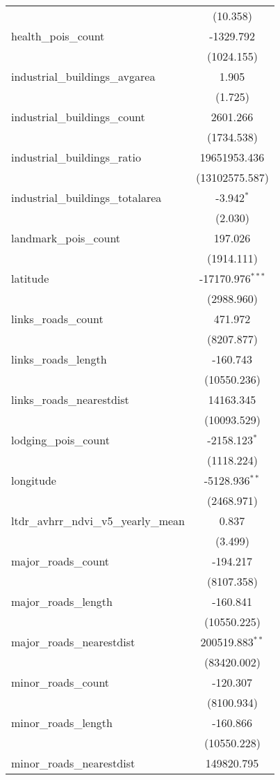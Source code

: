 \begin{table}[!htbp]
\begin{tabular}{@{\extracolsep{5pt}}lc}
  & (10.358) \\
 health_pois_count & -1329.792$^{}$ \\
  & (1024.155) \\
 industrial_buildings_avgarea & 1.905$^{}$ \\
  & (1.725) \\
 industrial_buildings_count & 2601.266$^{}$ \\
  & (1734.538) \\
 industrial_buildings_ratio & 19651953.436$^{}$ \\
  & (13102575.587) \\
 industrial_buildings_totalarea & -3.942$^{*}$ \\
  & (2.030) \\
 landmark_pois_count & 197.026$^{}$ \\
  & (1914.111) \\
 latitude & -17170.976$^{***}$ \\
  & (2988.960) \\
 links_roads_count & 471.972$^{}$ \\
  & (8207.877) \\
 links_roads_length & -160.743$^{}$ \\
  & (10550.236) \\
 links_roads_nearestdist & 14163.345$^{}$ \\
  & (10093.529) \\
 lodging_pois_count & -2158.123$^{*}$ \\
  & (1118.224) \\
 longitude & -5128.936$^{**}$ \\
  & (2468.971) \\
 ltdr_avhrr_ndvi_v5_yearly_mean & 0.837$^{}$ \\
  & (3.499) \\
 major_roads_count & -194.217$^{}$ \\
  & (8107.358) \\
 major_roads_length & -160.841$^{}$ \\
  & (10550.225) \\
 major_roads_nearestdist & 200519.883$^{**}$ \\
  & (83420.002) \\
 minor_roads_count & -120.307$^{}$ \\
  & (8100.934) \\
 minor_roads_length & -160.866$^{}$ \\
  & (10550.228) \\
 minor_roads_nearestdist & 149820.795$^{}$ \\

\end{tabular}
\end{table}
